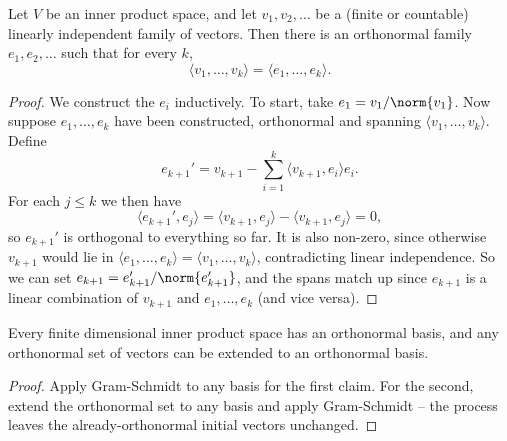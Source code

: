 \documentclass[a4paper]{scrartcl}
\begin{document}
\begin{center}
\end{center}

\begin{theorem}
    Let $V$ be an inner product space, and let $v_1, v_2, \dots$ be a (finite or countable) linearly independent family of vectors. Then there is an orthonormal family $e_1, e_2, \dots$ such that for every $k$,
    $$
    \langle v_1, \dots, v_k \rangle = \langle e_1, \dots, e_k \rangle.
    $$
\end{theorem}
\begin{proof}
    We construct the $e_i$ inductively. To start, take $e_1 = v_1/\norm{v_1}$. Now suppose $e_1, \dots, e_k$ have been constructed, orthonormal and spanning $\langle v_1, \dots, v_k\rangle$. Define
    $$
    e_{k+1}' = v_{k + 1} - \sum_{i = 1}^k \langle v_{k+1}, e_i \rangle e_i.
    $$
    For each $j \leq k$ we then have
    $$
    \langle e_{k+1}', e_j \rangle = \langle v_{k + 1}, e_j\rangle - \langle v_{k+1}, e_j \rangle = 0,
    $$
    so $e_{k+1}'$ is orthogonal to everything so far. It is also non-zero, since otherwise $v_{k+1}$ would lie in $\langle e_1, \dots, e_k \rangle = \langle v_1, \dots, v_k\rangle$, contradicting linear independence. So we can set $e_{k+1} = e_{k+1}'/\norm{e_{k+1}'}$, and the spans match up since $e_{k + 1}$ is a linear combination of $v_{k+1}$ and $e_1, \dots, e_k$ (and vice versa).
\end{proof}

\begin{corollary}
    Every finite dimensional inner product space has an orthonormal basis, and any orthonormal set of vectors can be extended to an orthonormal basis.
\end{corollary}
\begin{proof}
    Apply Gram-Schmidt to any basis for the first claim. For the second, extend the orthonormal set to any basis and apply Gram-Schmidt -- the process leaves the already-orthonormal initial vectors unchanged.
\end{proof}
\end{document}
